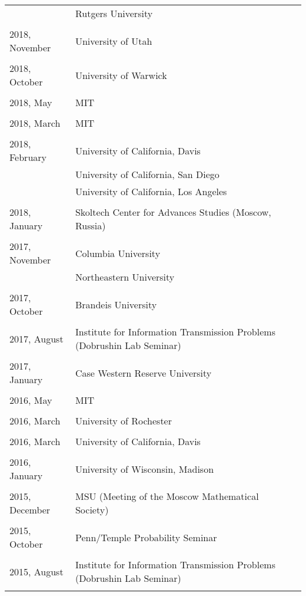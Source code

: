 \documentclass[letterpaper,11pt]{article}
\begin{document}
\begin{longtable}{llc}
	& Rutgers University
	\\\\
	2018, November
	& University of Utah
	\\\\
	2018, October
	& University of Warwick
	\\\\
	2018, May
	& MIT
	\\\\
	2018, March
	& MIT
	\\\\
	2018, February 
	& University of California, Davis
	\\
	& University of California, San Diego
	\\
	& University of California, Los Angeles
	\\\\
	2018, January
	& Skoltech Center for Advances Studies (Moscow, Russia)
	\\\\
	2017, November
	& Columbia University
	\\
	& Northeastern University
	\\\\
	2017, October
	& Brandeis University
	\\\\
	2017, August
	& Institute for Information Transmission Problems
	(Dobrushin Lab Seminar)
	\\\\
	2017, January
	& Case Western Reserve University
	\\\\
	2016, May
	& MIT
	\\\\
	2016, March
	& University of Rochester
	\\\\
	2016, March
	& University of California, Davis
	\\\\
	2016, January
	& University of Wisconsin, Madison
	\\\\
	2015, December
	& MSU (Meeting of the Moscow Mathematical Society)
	\\\\
	2015, October
	& Penn/Temple Probability Seminar
	\\\\

	2015, August
	& Institute for Information Transmission Problems
	(Dobrushin Lab Seminar)
	\\\\


\end{longtable}
\end{document}
